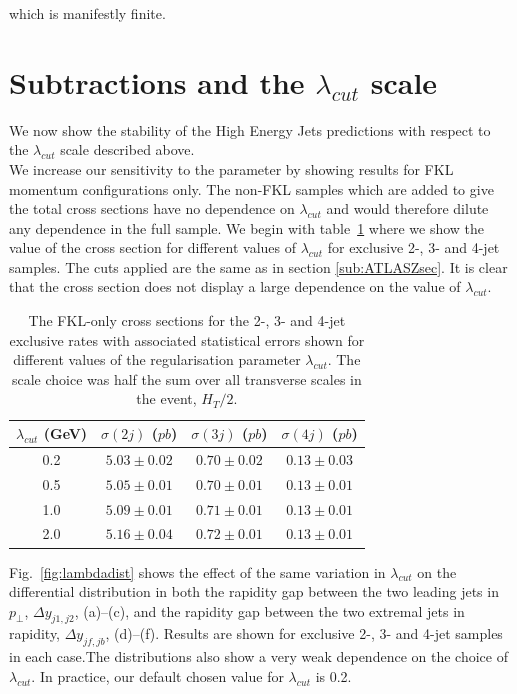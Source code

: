 		which is manifestly finite.

\section{Subtractions and the $\lambda_{cut}$ scale}
	\label{sec:indep-lambd}

	We now show the stability of the High Energy Jets predictions with respect to the
	$\lambda_{cut}$ scale described above.\\We
	increase our sensitivity to the parameter by showing results for FKL momentum
	configurations only.  The non-FKL samples which are added to give the total
	cross sections have no dependence on $\lambda_{cut}$ and would therefore dilute
	any dependence in the full sample.  We begin with table~\ref{tab:lambdaxs} where we show the value of
	the cross section for different values of $\lambda_{cut}$ for exclusive 2-, 3-
	and 4-jet samples.  The cuts applied are the same as in section \ref{sub:ATLASZsec}.
	It is clear that the cross section does not display a large dependence on the
	value of $\lambda_{cut}$.

	\begin{table}[hbt!]
		\begin{center}
		\begin{tabular}{| c | c | c | c |}
		\hline
		$\lambda_{cut}$ (GeV) & $\sigma(2j)$ ($pb$) & $\sigma(3j)$ ($pb$) & $\sigma(4j)$ ($pb$) \\ \hline
		0.2 & $5.03 \pm 0.02$ & $0.70 \pm 0.02$ & $0.13 \pm 0.03$ \\
		0.5 & $5.05 \pm 0.01$ & $0.70 \pm 0.01$ & $0.13 \pm 0.01$ \\
		1.0 & $5.09 \pm 0.01$ & $0.71 \pm 0.01$ & $0.13 \pm 0.01$ \\
		2.0 & $5.16 \pm 0.04$ & $0.72 \pm 0.01$ & $0.13 \pm 0.01$ \\ \hline
		\end{tabular}
		\caption{The FKL-only cross sections for the 2-, 3- and 4-jet exclusive rates
		with associated statistical errors shown for different values of the regularisation parameter
		$\lambda_{cut}$.  The scale choice was half the sum over all transverse scales in the event, $H_T/2$.}
		\label{tab:lambdaxs}
		\end{center}
	\end{table}

	Fig.~\eqref{fig:lambdadist} shows the effect of the same variation in $\lambda_{cut}$ on the
	differential distribution in both the rapidity gap between the two leading jets in $p_\perp$,
	$\Delta y_{j1, j2}$, (a)--(c), and the rapidity gap between the two extremal jets in
	rapidity, $\Delta y_{jf, jb}$, (d)--(f).  Results are shown for exclusive 2-, 3-
	and 4-jet samples in each case.The distributions also show a very weak
	dependence on the choice of $\lambda_{cut}$.
	In practice, our default chosen value for $\lambda_{cut}$ is 0.2.

